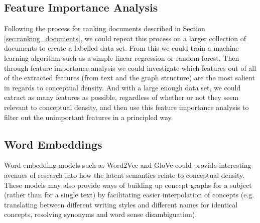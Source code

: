 \documentclass[12pt]{article}
\theoremstyle{grammarstyle}
\begin{document}
\subsection{Feature Importance Analysis}
Following the process for ranking documents described in Section \ref{sec:ranking_documents}, we could repeat this process on a larger collection of documents to create a labelled data set. From this we could train a machine learning algorithm such as a simple linear regression or random forest. Then through feature importance analysis we could investigate which features out of all of the extracted features (from text and the graph structure) are the most salient in regards to conceptual density. And with a large enough data set, we could extract as many features as possible, regardless of whether or not they seem relevant to conceptual density, and then use this feature importance analysis to filter out the unimportant features in a principled way.

\subsection{Word Embeddings}
Word embedding models such as Word2Vec \citep{mikolov2013efficient} and GloVe \citep{pennington2014glove} could provide interesting avenues of research into how the latent semantics relate to conceptual density. These models may also provide ways of building up concept graphs for a subject (rather than for a single text) by facilitating easier interpolation of concepts (e.g. translating between different writing styles and different names for identical concepts, resolving synonyms and word sense disambiguation).


\end{document}
